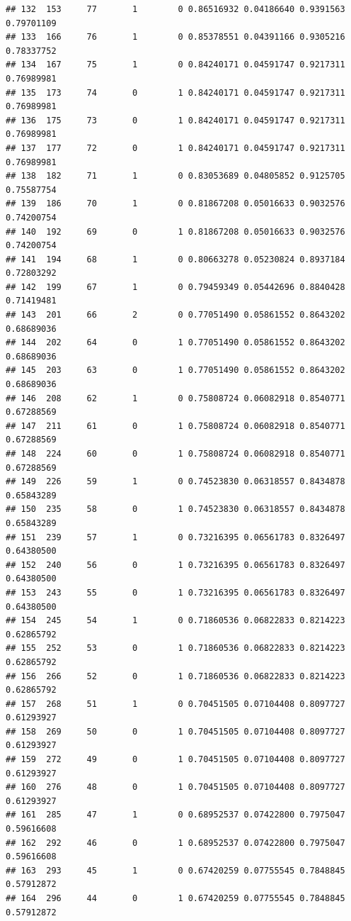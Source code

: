 \documentclass[
]{book}
\begin{document}
\begin{verbatim}
## 132  153     77       1        0 0.86516932 0.04186640 0.9391563 0.79701109
## 133  166     76       1        0 0.85378551 0.04391166 0.9305216 0.78337752
## 134  167     75       1        0 0.84240171 0.04591747 0.9217311 0.76989981
## 135  173     74       0        1 0.84240171 0.04591747 0.9217311 0.76989981
## 136  175     73       0        1 0.84240171 0.04591747 0.9217311 0.76989981
## 137  177     72       0        1 0.84240171 0.04591747 0.9217311 0.76989981
## 138  182     71       1        0 0.83053689 0.04805852 0.9125705 0.75587754
## 139  186     70       1        0 0.81867208 0.05016633 0.9032576 0.74200754
## 140  192     69       0        1 0.81867208 0.05016633 0.9032576 0.74200754
## 141  194     68       1        0 0.80663278 0.05230824 0.8937184 0.72803292
## 142  199     67       1        0 0.79459349 0.05442696 0.8840428 0.71419481
## 143  201     66       2        0 0.77051490 0.05861552 0.8643202 0.68689036
## 144  202     64       0        1 0.77051490 0.05861552 0.8643202 0.68689036
## 145  203     63       0        1 0.77051490 0.05861552 0.8643202 0.68689036
## 146  208     62       1        0 0.75808724 0.06082918 0.8540771 0.67288569
## 147  211     61       0        1 0.75808724 0.06082918 0.8540771 0.67288569
## 148  224     60       0        1 0.75808724 0.06082918 0.8540771 0.67288569
## 149  226     59       1        0 0.74523830 0.06318557 0.8434878 0.65843289
## 150  235     58       0        1 0.74523830 0.06318557 0.8434878 0.65843289
## 151  239     57       1        0 0.73216395 0.06561783 0.8326497 0.64380500
## 152  240     56       0        1 0.73216395 0.06561783 0.8326497 0.64380500
## 153  243     55       0        1 0.73216395 0.06561783 0.8326497 0.64380500
## 154  245     54       1        0 0.71860536 0.06822833 0.8214223 0.62865792
## 155  252     53       0        1 0.71860536 0.06822833 0.8214223 0.62865792
## 156  266     52       0        1 0.71860536 0.06822833 0.8214223 0.62865792
## 157  268     51       1        0 0.70451505 0.07104408 0.8097727 0.61293927
## 158  269     50       0        1 0.70451505 0.07104408 0.8097727 0.61293927
## 159  272     49       0        1 0.70451505 0.07104408 0.8097727 0.61293927
## 160  276     48       0        1 0.70451505 0.07104408 0.8097727 0.61293927
## 161  285     47       1        0 0.68952537 0.07422800 0.7975047 0.59616608
## 162  292     46       0        1 0.68952537 0.07422800 0.7975047 0.59616608
## 163  293     45       1        0 0.67420259 0.07755545 0.7848845 0.57912872
## 164  296     44       0        1 0.67420259 0.07755545 0.7848845 0.57912872

\end{verbatim}
\end{document}
